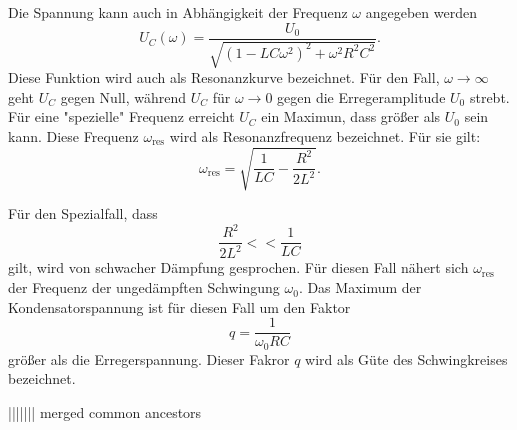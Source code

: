 Die Spannung kann auch in Abhängigkeit der Frequenz $\omega$ angegeben werden
\begin{equation}
  U_{C}(\omega)=\frac{U_{0}}{\sqrt{(1-LC\omega^2)^2+\omega^2R^2C^2}}.
\end{equation}
Diese Funktion wird auch als Resonanzkurve bezeichnet. Für den Fall,
$\omega \to \infty$ geht $U_{C}$ gegen Null, während $U_{C}$ für
$\omega \to 0$ gegen die Erregeramplitude $U_{0}$ strebt.
Für eine "spezielle" Frequenz erreicht $U_{C}$ ein Maximun, dass größer
als $U_{0}$ sein kann. Diese Frequenz $\omega_{\text{res}}$ wird als Resonanzfrequenz
bezeichnet. Für sie gilt:
\begin{equation}
  \omega_{\text{res}}=\sqrt{\frac{1}{LC}-\frac{R^2}{2L^2}}.
  \label{eqn:res}
\end{equation}

Für den Spezialfall, dass
\begin{equation}
  \frac{R^2}{2L^2}<<\frac{1}{LC}
\end{equation}
gilt, wird von schwacher Dämpfung gesprochen. Für diesen Fall nähert sich
$\omega_{\text{res}}$ der Frequenz der ungedämpften Schwingung $\omega_{0}$.
Das Maximum der Kondensatorspannung ist für diesen Fall um den Faktor
\begin{equation}
  q=\frac{1}{\omega_{0}RC}
  \label{eqn:gute}
\end{equation}
größer als die Erregerspannung. Dieser Fakror $q$ wird als Güte des Schwingkreises
bezeichnet.



\label{sec:Theorie}

||||||| merged common ancestors
